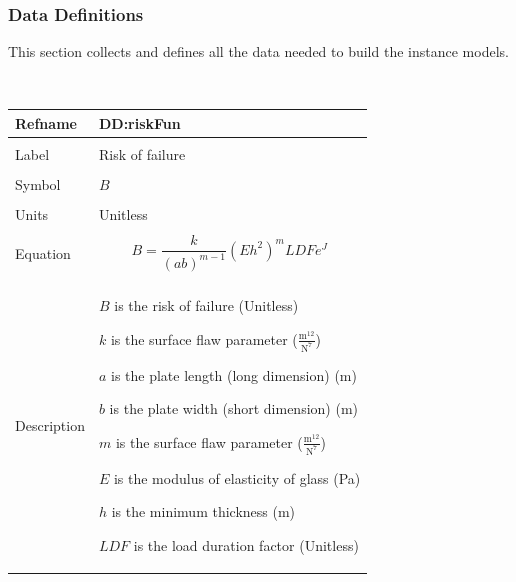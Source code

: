 \documentclass[12pt]{article}
\begin{document}
\subsubsection{Data Definitions}
\label{Sec:DDs}
This section collects and defines all the data needed to build the instance models.
\par~

\noindent \begin{minipage}{\textwidth}
          \begin{tabular}{>{\raggedright}p{}>{\raggedright\arraybackslash}p{}}
          \toprule \textbf{Refname} & \textbf{DD:riskFun}
          \label{DD:riskFun}
          \\ \midrule \\
          Label & Risk of failure
          \\ \midrule \\
          Symbol & $B$
          \\ \midrule \\
          Units & Unitless
          \\ \midrule \\
          Equation & \begin{displaymath}
                     B=\frac{k}{\left(a b\right)^{m-1}} \left(E h^{2}\right)^{m} LDF e^{J}
                     \end{displaymath}
          \\ \midrule \\
          Description & \begin{symbDescription}
                        \item{$B$ is the risk of failure (Unitless)}
                        \item{$k$ is the surface flaw parameter ($\frac{\text{m}^{12}}{\text{N}^{7}}$)}
                        \item{$a$ is the plate length (long dimension) (m)}
                        \item{$b$ is the plate width (short dimension) (m)}
                        \item{$m$ is the surface flaw parameter ($\frac{\text{m}^{12}}{\text{N}^{7}}$)}
                        \item{$E$ is the modulus of elasticity of glass (Pa)}
                        \item{$h$ is the minimum thickness (m)}
                        \item{$LDF$ is the load duration factor (Unitless)}

\end{symbDescription}
\end{tabular}
\end{minipage}
\end{document}
